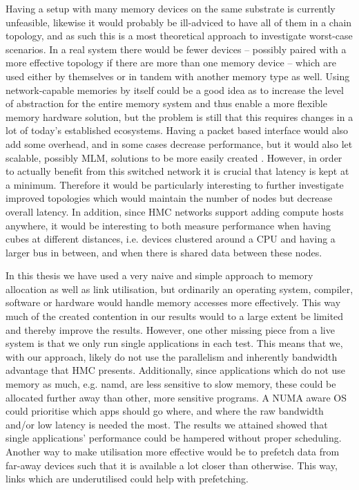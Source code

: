 Having a setup with many memory devices on the same substrate is currently unfeasible, likewise it would probably be ill-adviced to have all of them in a chain topology, and as such this is a most theoretical approach to investigate worst-case scenarios. In a real system there would be fewer devices -- possibly paired with a more effective topology if there are more than one memory device -- which are used either by themselves or in tandem with another memory type as well. Using network-capable memories by itself could be a good idea as to increase the level of abstraction for the entire memory system and thus enable a more flexible memory hardware solution, but the problem is still that this requires changes in a lot of today's established ecosystems. Having a packet based interface would also add some overhead, and in some cases decrease performance, but it would also let scalable, possibly MLM, solutions to be more easily created \cite{8167757}. However, in order to actually benefit from this switched network it is crucial that latency is kept at a minimum. Therefore it would be particularly interesting to further investigate improved topologies which would maintain the number of nodes but decrease overall latency. In addition, since HMC networks support adding compute hosts anywhere, it would be interesting to both measure performance when having cubes at different distances, i.e. devices clustered around a CPU and having a larger bus in between, and when there is shared data between these nodes.
\bigskip

In this thesis we have used a very naive and simple approach to memory allocation as well as link utilisation, but ordinarily an operating system, compiler, software or hardware would handle memory accesses more effectively. This way much of the created contention in our results would to a large extent be limited and thereby improve the results. However, one other missing piece from a live system is that we only run single applications in each test. This means that we, with our approach, likely do not use the parallelism and inherently bandwidth advantage that HMC presents. Additionally, since applications which do not use memory as much, e.g. namd, are less sensitive to slow memory, these could be allocated further away than other, more sensitive programs. A NUMA aware OS could prioritise which apps should go where, and where the raw bandwidth and/or low latency is needed the most. The results we attained showed that single applications' performance could be hampered without proper scheduling. Another way to make utilisation more effective would be to prefetch data from far-away devices such that it is available a lot closer than otherwise. This way, links which are underutilised could help with prefetching. 
\bigskip


